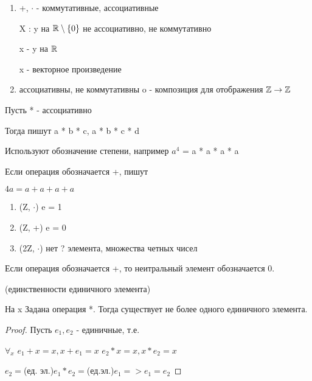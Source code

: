 \begin{eg}

\begin{enumerate}
    \item +, $\cdot$ - коммутативные, ассоциативные 
    
    X : y на $\mathbb{R} \setminus \{0\}$ не ассоциативно, не коммутативно

    x - y на $\mathbb{R}$

    x - векторное произведение

    \item ассоциативны, не коммутативны
    o - композиция для отображения $\mathbb{Z} \to \mathbb{Z}$

\end{enumerate}

\end{eg}

\begin{notation}
    Пусть * - ассоциативно

    Тогда пишут a * b * c, a * b * c * d

    Используют обозначение степени, например $a^4$ = a * a * a * a

    Если операция обозначается +, пишут

    $4a = a + a + a + a$


\end{notation}

\begin{eg}
    \begin{enumerate}
        \item (Z, $\cdot$) e = 1
        \item (Z, +) e = 0
        \item (2Z, $\cdot$) нет ? элемента, множества четных чисел
    \end{enumerate}
\end{eg}

\begin{remark}
    Если операция обозначается +, то неитральный элемент обозначается 0.
\end{remark}

\begin{property} (единственности единичного элемента)

    На x Задана операция *. Тогда существует не более одного единичного элемента.
\end{property}

\begin{proof}
    Пусть $e_1, e_2$ - единичные, т.е.

    $\forall_x$
    $e_1 + x = x, x + e_1 = x$
    $e_2 * x = x, x * e_2 = x$

    $e_2 = $(ед. эл.)$ e_1 * e_2 = $(ед.эл.)$ e_1 => e_1 = e_2$


\end{proof}

